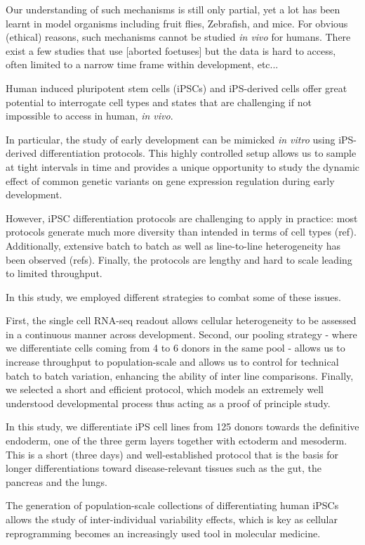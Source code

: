 Our understanding of such mechanisms is still only partial, yet a lot has been learnt in model organisms including fruit flies, Zebrafish, and mice. 
For obvious (ethical) reasons, such mechanisms cannot be studied \textit{in vivo} for humans. There exist a few studies that use [aborted foetuses] but the data is hard to access, often limited to a narrow time frame within development, etc...

Human induced pluripotent stem cells (iPSCs) and iPS-derived cells offer great potential to interrogate cell types and states that are challenging if not impossible to access in human, \textit{in vivo}.

In particular, the study of early development can be mimicked \textit{in vitro} using iPS-derived differentiation protocols. 
This highly controlled setup allows us to sample at tight intervals in time and provides a unique opportunity to study the dynamic effect of common genetic variants on gene expression regulation during early development.

However, iPSC differentiation protocols are challenging to apply in practice: most protocols generate much more diversity than intended in terms of cell types (ref). 
Additionally, extensive batch to batch as well as line-to-line heterogeneity has been observed (refs). Finally, the protocols are lengthy and hard to scale leading to limited throughput. 
 
In this study, we employed different strategies to combat some of these issues. 

First, the single cell RNA-seq readout allows cellular heterogeneity to be assessed in a continuous manner across development.
Second, our pooling strategy - where we differentiate cells coming from 4 to 6 donors in the same pool - allows us to increase throughput to population-scale and allows us to control for technical batch to batch variation, enhancing the ability of inter line comparisons.
Finally, we selected a short and efficient protocol, which models an extremely well understood developmental process thus acting as a proof of principle study.

In this study, we differentiate iPS cell lines from 125 donors towards the definitive endoderm, one of the three germ layers together with ectoderm and mesoderm. 
This is a short (three days) and well-established protocol that is the basis for longer differentiations toward disease-relevant tissues such as the gut, the pancreas and the lungs.

The generation of population-scale collections of differentiating human iPSCs allows the study of inter-individual variability effects, which is key as cellular reprogramming becomes an increasingly used tool in molecular medicine.

